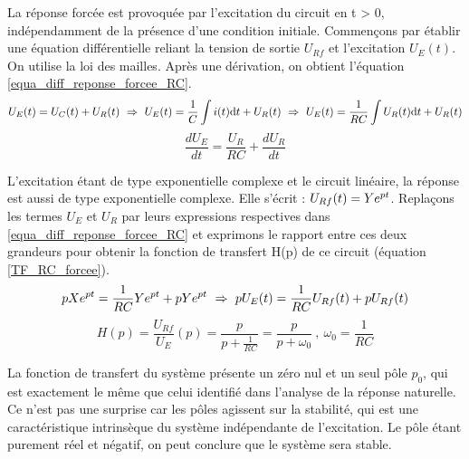         La réponse forcée est provoquée par l'excitation du circuit en
        t > 0, indépendamment de la présence d'une condition
        initiale. Commençons par établir une équation différentielle
        reliant la tension de sortie $U_{Rf}$ et l'excitation
        $U_{E}(t)$. On utilise la loi des mailles. Après une
        dérivation, on obtient l'équation
        \ref{equa_diff_reponse_forcee_RC}.
	\begin{equation*}\label{}
          U_{E}(t)=U_{C}(t)+U_{R}(t) ~ \Rightarrow ~ U_{E}(t)=\frac{1}{C}\int i(t) \mathrm{d{}} t+U_{R}(t)~ \Rightarrow ~U_{E}(t)=\frac{1}{RC}\int U_{R}(t) \mathrm{d{}} t+U_{R}(t)
	\end{equation*} 
	\begin{equation}\label{equa_diff_reponse_forcee_RC}
          \frac{dU_{E}}{dt}=\frac{U_{R}}{RC}+\frac{dU_{R}}{dt}
	\end{equation}

	L'excitation étant de type exponentielle complexe et le
        circuit linéaire, la réponse est aussi de type exponentielle
        complexe. Elle s'écrit : $U_{Rf}(t)=Ye^{pt}$. Replaçons les
        termes $U_{E}$ et $U_{R}$ par leurs expressions respectives
        dans \ref{equa_diff_reponse_forcee_RC} et exprimons le rapport
        entre ces deux grandeurs pour obtenir la fonction de transfert
        H(p) de ce circuit (équation \ref{TF_RC_forcee}).
	\begin{equation*}
          pXe^{pt}=\frac{1}{RC} Ye^{pt}+pYe^{pt} ~\Rightarrow~pU_{E}(t)=\frac{1}{RC}U_{Rf}(t)+pU_{Rf}(t)
	\end{equation*}
	\begin{equation}\label{TF_RC_forcee}
          H(p)=\frac{U_{Rf}}{U_{E}}(p)=\frac{p}{p+\frac{1}{RC}}=\frac{p}{p+\omega_{0}}~,~\omega_{0}=\frac{1}{RC}
	\end{equation}

	La fonction de transfert du système présente un zéro nul et un
        seul pôle $p_{0}$, qui est exactement le même que celui
        identifié dans l'analyse de la réponse naturelle. Ce n'est pas
        une surprise car les pôles agissent sur la stabilité, qui est
        une caractéristique intrinsèque du système indépendante de
        l'excitation. Le pôle étant purement réel et négatif, on peut
        conclure que le système sera stable.
		
